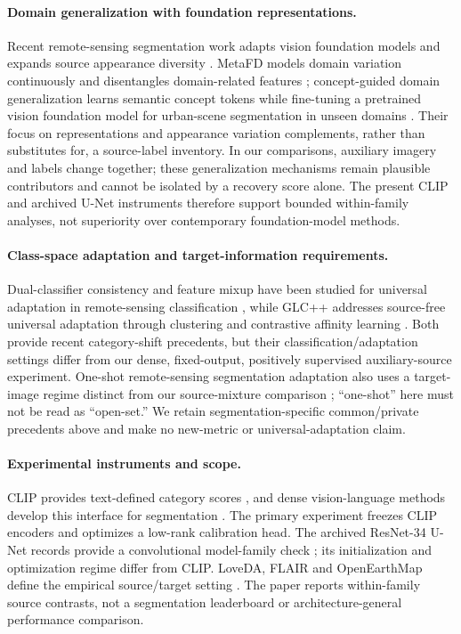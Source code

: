\paragraph{Domain generalization with foundation representations.}
Recent remote-sensing segmentation work adapts vision foundation models and expands source appearance diversity \citep{luo2025vfmdg}. MetaFD models domain variation continuously and disentangles domain-related features \citep{liang2025metafd}; concept-guided domain generalization learns semantic concept tokens while fine-tuning a pretrained vision foundation model for urban-scene segmentation in unseen domains \citep{liao2025concept}. Their focus on representations and appearance variation complements, rather than substitutes for, a source-label inventory. In our comparisons, auxiliary imagery and labels change together; these generalization mechanisms remain plausible contributors and cannot be isolated by a recovery score alone. The present CLIP and archived U-Net instruments therefore support bounded within-family analyses, not superiority over contemporary foundation-model methods.

\paragraph{Class-space adaptation and target-information requirements.}
Dual-classifier consistency and feature mixup have been studied for universal adaptation in remote-sensing classification \citep{li2025boostingunida}, while GLC++ addresses source-free universal adaptation through clustering and contrastive affinity learning \citep{qu2025glcpp}. Both provide recent category-shift precedents, but their classification/adaptation settings differ from our dense, fixed-output, positively supervised auxiliary-source experiment. One-shot remote-sensing segmentation adaptation also uses a target-image regime distinct from our source-mixture comparison \citep{tan2025oneshot}; ``one-shot'' here must not be read as ``open-set.'' We retain segmentation-specific common/private precedents above and make no new-metric or universal-adaptation claim.

\paragraph{Experimental instruments and scope.}
CLIP provides text-defined category scores \citep{radford2021clip}, and dense vision-language methods develop this interface for segmentation \citep{xu2022groupvit,zhou2022denseclip,li2022lseg}. The primary experiment freezes CLIP encoders and optimizes a low-rank calibration head. The archived ResNet-34 U-Net records provide a convolutional model-family check \citep{ronneberger2015unet}; its initialization and optimization regime differ from CLIP. LoveDA, FLAIR and OpenEarthMap define the empirical source/target setting \citep{wang2021loveda,garioud2023flair,xia2023openearthmap}. The paper reports within-family source contrasts, not a segmentation leaderboard or architecture-general performance comparison.

